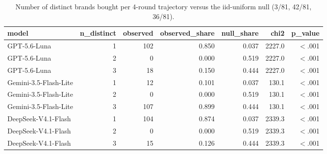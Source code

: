 \begin{table}[htbp]
\centering
\scriptsize
\caption{Number of distinct brands bought per 4-round trajectory versus the iid-uniform null (3/81, 42/81, 36/81).}
\label{tab:tab06_e0_4r_distinct_brands}
\begin{tabular}{lrrrrrr}
\toprule
model & n\_distinct & observed & observed\_share & null\_share & chi2 & p\_value \\
\midrule
GPT-5.6-Luna & 1 & 102 & 0.850 & 0.037 & 2227.0 & $<$.001 \\
GPT-5.6-Luna & 2 & 0 & 0.000 & 0.519 & 2227.0 & $<$.001 \\
GPT-5.6-Luna & 3 & 18 & 0.150 & 0.444 & 2227.0 & $<$.001 \\
Gemini-3.5-Flash-Lite & 1 & 12 & 0.101 & 0.037 & 130.1 & $<$.001 \\
Gemini-3.5-Flash-Lite & 2 & 0 & 0.000 & 0.519 & 130.1 & $<$.001 \\
Gemini-3.5-Flash-Lite & 3 & 107 & 0.899 & 0.444 & 130.1 & $<$.001 \\
DeepSeek-V4.1-Flash & 1 & 104 & 0.874 & 0.037 & 2339.3 & $<$.001 \\
DeepSeek-V4.1-Flash & 2 & 0 & 0.000 & 0.519 & 2339.3 & $<$.001 \\
DeepSeek-V4.1-Flash & 3 & 15 & 0.126 & 0.444 & 2339.3 & $<$.001 \\
\bottomrule
\end{tabular}
\end{table}
